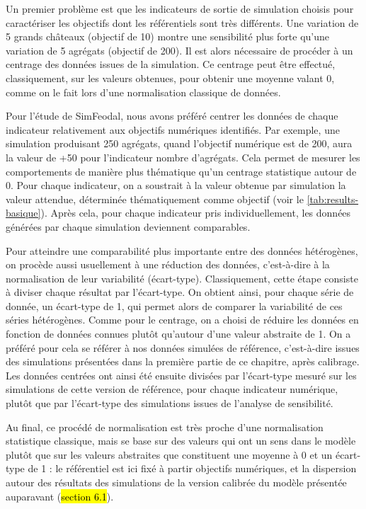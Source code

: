 Un premier problème est que les indicateurs de sortie de simulation choisis pour caractériser les objectifs dont les référentiels sont très différents.
Une variation de 5 grands châteaux (objectif de 10) montre une sensibilité plus forte qu'une variation de 5 agrégats (objectif de 200).
Il est alors nécessaire de procéder à un \og centrage \fg{} des données issues de la simulation.
Ce centrage peut être effectué, classiquement, sur les valeurs obtenues, pour obtenir une moyenne valant 0, comme on le fait lors d'une normalisation classique de données.

Pour l'étude de SimFeodal, nous avons préféré centrer les données de chaque indicateur relativement aux objectifs numériques identifiés.
Par exemple, une simulation produisant 250 agrégats, quand l'objectif numérique est de 200, aura la valeur de +50 pour l'indicateur \og nombre d'agrégats\fg{}.
Cela permet de mesurer les comportements de manière plus thématique qu'un centrage statistique autour de 0.
Pour chaque indicateur, on a soustrait à la valeur obtenue par simulation la \og valeur attendue\fg{}, déterminée thématiquement comme objectif (voir le \cref{tab:results-basique}).
Après cela, pour chaque indicateur pris individuellement, les données générées par chaque simulation deviennent comparables.

Pour atteindre une comparabilité plus importante entre des données hétérogènes, on procède aussi usuellement à une \og réduction\fg{} des données, c'est-à-dire à la normalisation de leur variabilité (écart-type).
Classiquement, cette étape consiste à diviser chaque résultat par l'écart-type.
On obtient ainsi, pour chaque série de donnée, un écart-type de 1, qui permet alors de comparer la variabilité de ces séries hétérogènes.
Comme pour le centrage, on a choisi de réduire les données en fonction de données connues plutôt qu'autour d'une valeur abstraite de 1.
On a préféré pour cela se référer à nos données simulées de référence, c'est-à-dire issues des simulations présentées dans la première partie de ce chapitre, après calibrage.
Les données centrées ont ainsi été ensuite divisées par l'écart-type mesuré sur les simulations de cette version de référence, pour chaque indicateur numérique, plutôt que par l'écart-type des simulations issues de l'analyse de sensibilité.

Au final, ce procédé de normalisation est très proche d'une normalisation statistique classique, mais se base sur des valeurs qui ont un sens dans le modèle plutôt que sur les valeurs \og abstraites\fg{} que constituent une moyenne à 0 et un écart-type de 1 : le référentiel est ici fixé à partir objectifs numériques, et la dispersion autour des résultats des simulations de la version calibrée du modèle présentée auparavant (\hl{section 6.1}).

